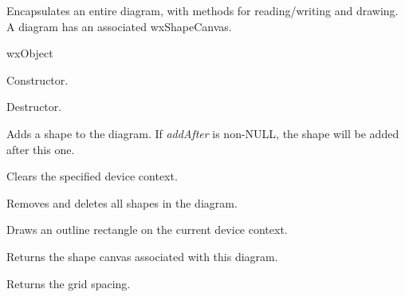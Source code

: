 Encapsulates an entire diagram, with methods for reading/writing and drawing.
A diagram has an associated wxShapeCanvas.


wxObject






Constructor.



Destructor.



Adds a shape to the diagram. If {\it addAfter} is non-NULL, the shape will be added after this
one.



Clears the specified device context.



Removes and deletes all shapes in the diagram.



Draws an outline rectangle on the current device context.



Returns the shape canvas associated with this diagram.



Returns the grid spacing.


